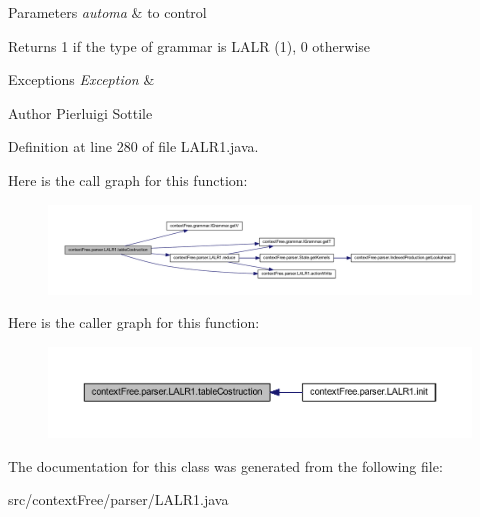 \begin{DoxyParams}{Parameters}
{\em automa} & to control \\
\hline
\end{DoxyParams}
\begin{DoxyReturn}{Returns}
1 if the type of grammar is L\-A\-L\-R (1), 0 otherwise 
\end{DoxyReturn}

\begin{DoxyExceptions}{Exceptions}
{\em Exception} & \\
\hline
\end{DoxyExceptions}
\begin{DoxyAuthor}{Author}
Pierluigi Sottile 
\end{DoxyAuthor}


Definition at line 280 of file L\-A\-L\-R1.\-java.



Here is the call graph for this function\-:
\nopagebreak
\begin{figure}[H]
\begin{center}
\leavevmode
\includegraphics[width=350pt]{classcontext_free_1_1parser_1_1_l_a_l_r1_a79576626b3b59b832faecc986b293b36_cgraph}
\end{center}
\end{figure}




Here is the caller graph for this function\-:
\nopagebreak
\begin{figure}[H]
\begin{center}
\leavevmode
\includegraphics[width=350pt]{classcontext_free_1_1parser_1_1_l_a_l_r1_a79576626b3b59b832faecc986b293b36_icgraph}
\end{center}
\end{figure}




The documentation for this class was generated from the following file\-:\begin{DoxyCompactItemize}
\item 
src/context\-Free/parser/L\-A\-L\-R1.\-java\end{DoxyCompactItemize}
